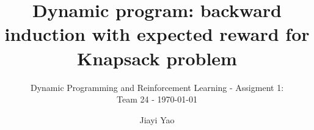 \documentclass[sigconf]{acmart}
\begin{document}
\title{Dynamic program: backward induction with expected reward for Knapsack problem}
\subtitle{Dynamic Programming and Reinforcement Learning - Assigment 1: \\Team 24 - \today}

\author{Jiayi Yao}




\maketitle




\end{document}
